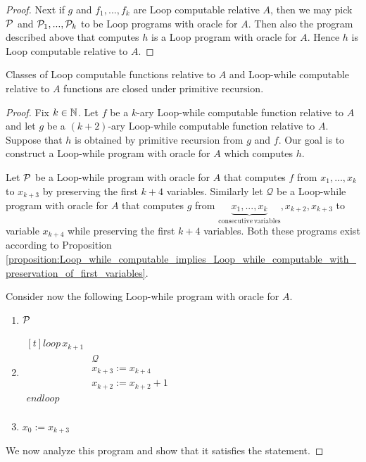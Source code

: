 \documentclass[10pt]{amsart}
\begin{document}
\begin{proof}
	Next if $g$ and $f_1,...,f_k$ are Loop computable relative $A$, then we may pick ${\mathcal P}$ and ${\mathcal P}_1,...,{\mathcal P}_k$ to be Loop programs with oracle for $A$. Then also the program described above that computes $h$ is a Loop program with oracle for $A$. Hence $h$ is Loop computable relative to $A$.
\end{proof}

\begin{proposition}\label{proposition:Loop_while_computable_functions_closed_under_primitive_recursion}
	Classes of Loop computable functions relative to $A$ and Loop-while computable relative to $A$ functions are closed under primitive recursion.
\end{proposition}
\begin{proof}
	Fix $k\in {\mathbb N}$. Let $f$ be a $k$-ary Loop-while computable function relative to $A$ and let $g$ be a $(k + 2)$-ary Loop-while computable function relative to $A$. Suppose that $h$ is obtained by primitive recursion from $g$ and $f$. Our goal is to construct a Loop-while program with oracle for $A$ which computes $h$.

	Let ${\mathcal P}$ be a Loop-while program with oracle for $A$ that computes $f$ from $x_1,...,x_k$ to $x_{k + 3}$ by preserving the first $k + 4$ variables. Similarly let $\mathcal{Q}$ be a Loop-while program with oracle for $A$ that computes $g$ from $\underbrace{x_1,...,x_k}_{\mathrm{consecutive\,variables}},x_{k+2},x_{k+3}$ to variable $x_{k + 4}$ while preserving the first $k + 4$ variables. Both these programs exist according to Proposition \ref{proposition:Loop_while_computable_implies_Loop_while_computable_with_preservation_of_first_variables}.

	Consider now the following Loop-while program with oracle for $A$.
	\begin{enumerate}[label=\textbf{(\arabic*)}, leftmargin=3.0em]
		\item ${\mathcal P}$
		\item $\begin{aligned}[t]
				      \mathit{loop}\,x_{k+1}  \\
				       & \mathcal{Q}          \\
				       & x_{k+3}:=x_{k+4}     \\
				       & x_{k+2}:=x_{k+2} + 1 \\
				      \mathit{endloop}        \\
			      \end{aligned}$
		\item $x_0 := x_{k+3}$
	\end{enumerate}
	We now analyze this program and show that it satisfies the statement.


\end{proof}
\end{document}
